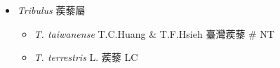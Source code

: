 
  \begin{itemize}
 \item[] \textit{Tribulus} 蒺藜屬
                                
  \begin{itemize}
        \item[] \textit{T. taiwanense} T.C.Huang \& T.F.Hsieh  臺灣蒺藜  \# NT
        \item[] \textit{T. terrestris} L.  蒺藜   LC
  \end{itemize}
  \end{itemize}
